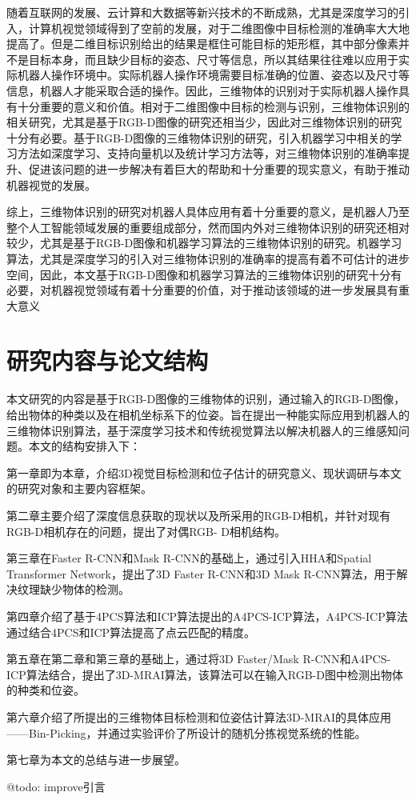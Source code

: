随着互联网的发展、云计算和大数据等新兴技术的不断成熟，尤其是深度学习的引入，计算机视觉领域得到了空前的发展，对于二维图像中目标检测的准确率大大地提高了。但是二维目标识别给出的结果是框住可能目标的矩形框，其中部分像素并不是目标本身，而且缺少目标的姿态、尺寸等信息，所以其结果往往难以应用于实际机器人操作环境中。实际机器人操作环境需要目标准确的位置、姿态以及尺寸等信息，机器人才能采取合适的操作。因此，三维物体的识别对于实际机器人操作具有十分重要的意义和价值。相对于二维图像中目标的检测与识别，三维物体识别的相关研究，尤其是基于RGB-D图像的研究还相当少，因此对三维物体识别的研究十分有必要。基于RGB-D图像的三维物体识别的研究，引入机器学习中相关的学习方法如深度学习、支持向量机以及统计学习方法等，对三维物体识别的准确率提升、促进该问题的进一步解决有着巨大的帮助和十分重要的现实意义，有助于推动机器视觉的发展。

综上，三维物体识别的研究对机器人具体应用有着十分重要的意义，是机器人乃至整个人工智能领域发展的重要组成部分，然而国内外对三维物体识别的研究还相对较少，尤其是基于RGB-D图像和机器学习算法的三维物体识别的研究。机器学习算法，尤其是深度学习的引入对三维物体识别的准确率的提高有着不可估计的进步空间，因此，本文基于RGB-D图像和机器学习算法的三维物体识别的研究十分有必要，对机器视觉领域有着十分重要的价值，对于推动该领域的进一步发展具有重大意义
\section{研究内容与论文结构}
本文研究的内容是基于RGB-D图像的三维物体的识别，通过输入的RGB-D图像，给出物体的种类以及在相机坐标系下的位姿。旨在提出一种能实际应用到机器人的三维物体识别算法，基于深度学习技术和传统视觉算法以解决机器人的三维感知问题。本文的结构安排入下：

第一章即为本章，介绍3D视觉目标检测和位子估计的研究意义、现状调研与本文的研究对象和主要内容框架。

第二章主要介绍了深度信息获取的现状以及所采用的RGB-D相机，并针对现有RGB-D相机存在的问题，提出了对偶RGB-
D相机结构。

第三章在Faster R-CNN和Mask R-CNN的基础上，通过引入HHA和Spatial Transformer Network，提出了3D Faster R-CNN和3D Mask R-CNN算法，用于解决纹理缺少物体的检测。

第四章介绍了基于4PCS算法和ICP算法提出的A4PCS-ICP算法，A4PCS-ICP算法通过结合4PCS和ICP算法提高了点云匹配的精度。

第五章在第二章和第三章的基础上，通过将3D Faster/Mask R-CNN和A4PCS-ICP算法结合，提出了3D-MRAI算法，该算法可以在输入RGB-D图中检测出物体的种类和位姿。

第六章介绍了所提出的三维物体目标检测和位姿估计算法3D-MRAI的具体应用——Bin-Picking，并通过实验评价了所设计的随机分拣视觉系统的性能。

第七章为本文的总结与进一步展望。

@todo: improve引言

